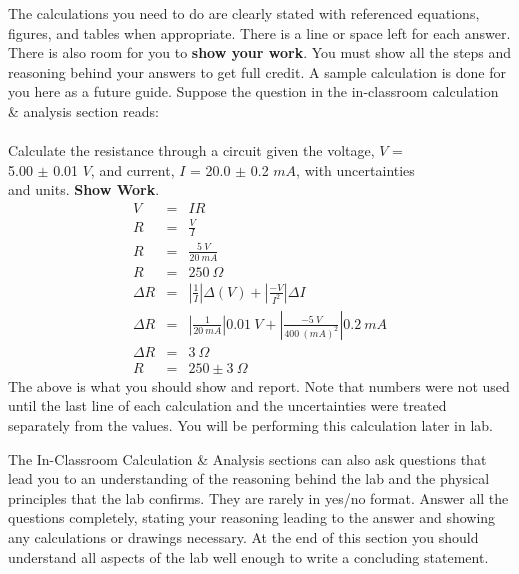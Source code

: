 The calculations you need to do are clearly stated with referenced
equations, figures, and tables when appropriate.  There is a line
or space left for each answer.  There is also room for you to 
{\bf show your work}.  You must show all the steps and reasoning behind
your answers to get full credit.  A sample calculation is done for you
here as a future guide.  Suppose the question in the in-classroom 
calculation \& analysis section reads: \\
\vspace*{0.3cm}  \\
\noindent \hspace*{1cm} Calculate the resistance through a circuit given the 
voltage, $V$ = \\
\hspace*{1.2cm}5.00 $\pm$ 0.01 $V$, and current, $I$ = 20.0 $\pm$ 0.2 $mA$, 
with uncertainties \\
\hspace*{1.2cm}and units.  {\bf Show Work}. \\
\begin{eqnarray*}
V & = & IR \\
R & = &  \frac{V}{I}  \\
R  & = &  \frac{5 \> V}{20\>mA} \\ 
R  & = &  250\> \Omega \\
\Delta R  & = & \left| \frac{1}{I} \right| \Delta(V) + \left| \frac{-V}{I^2} \right| \Delta I\\
\Delta R   & = & \left| \frac{1}{20 \> mA} \right| 0.01 \> V + \left| \frac{-5 \> V}{400 \> (mA)^2} \right| 0.2 \> mA \\
\Delta R  & = &  3 \> \Omega \\
R  & = & 250 \pm 3 \> \Omega 
\end{eqnarray*}
\noindent The above is what you should show and report.  Note that
numbers were not used until the last line of each calculation and
the uncertainties were treated separately from the values.  You will
be performing this calculation later in lab.  

The In-Classroom Calculation \& Analysis sections can also
ask questions that lead you to an understanding of the reasoning behind
the lab and the physical principles that the lab confirms.  They are rarely
in yes/no format.  Answer all the questions completely, stating
your reasoning leading to the answer and showing any calculations or
drawings necessary.  At the end of this section you should understand
all aspects of the lab well enough to write a concluding statement.

